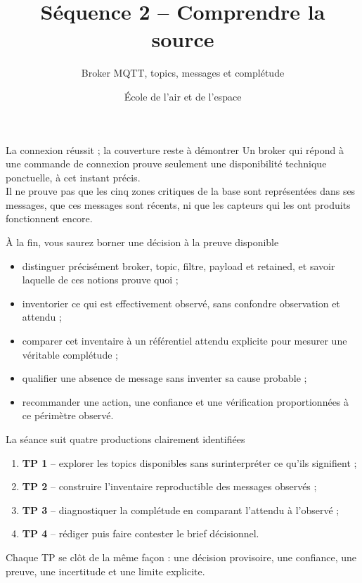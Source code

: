 \documentclass[aspectratio=169]{beamer}
\title{Séquence 2 -- Comprendre la source}
\subtitle{Broker MQTT, topics, messages et complétude}
\author{École de l'air et de l'espace}
\date{}
\begin{document}
\begin{frame}\titlepage\end{frame}

\begin{frame}{La connexion réussit ; la couverture reste à démontrer}
\large Un broker qui répond à une commande de connexion prouve seulement une disponibilité technique ponctuelle, à cet instant précis.\\[1em]
Il ne prouve pas que les cinq zones critiques de la base sont représentées dans ses messages, que ces messages sont récents, ni que les capteurs qui les ont produits fonctionnent encore.
\end{frame}

\begin{frame}{À la fin, vous saurez borner une décision à la preuve disponible}
\begin{itemize}
\item distinguer précisément broker, topic, filtre, payload et retained, et savoir laquelle de ces notions prouve quoi ;
\item inventorier ce qui est effectivement observé, sans confondre observation et attendu ;
\item comparer cet inventaire à un référentiel attendu explicite pour mesurer une véritable complétude ;
\item qualifier une absence de message sans inventer sa cause probable ;
\item recommander une action, une confiance et une vérification proportionnées à ce périmètre observé.
\end{itemize}
\end{frame}

\begin{frame}{La séance suit quatre productions clairement identifiées}
\begin{enumerate}
\item \textbf{TP 1} -- explorer les topics disponibles sans surinterpréter ce qu'ils signifient ;
\item \textbf{TP 2} -- construire l'inventaire reproductible des messages observés ;
\item \textbf{TP 3} -- diagnostiquer la complétude en comparant l'attendu à l'observé ;
\item \textbf{TP 4} -- rédiger puis faire contester le brief décisionnel.
\end{enumerate}
Chaque TP se clôt de la même façon : une décision provisoire, une confiance, une preuve, une incertitude et une limite explicite.
\end{frame}
\end{document}
